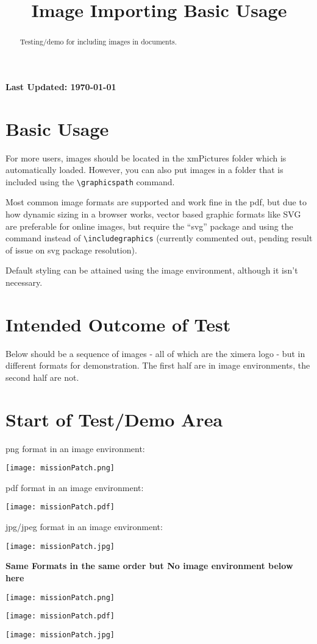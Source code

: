 \documentclass{ximera}
\title{Image Importing Basic Usage}
\begin{document}
\begin{abstract}
    Testing/demo for including images in documents.
\end{abstract}
\maketitle

{{\Huge \bfseries Last Updated: \today}} \\


\section{Basic Usage}
For more users, images should be located in the xmPictures folder which is automatically loaded.
However, you can also put images in a folder that is included using the \verb|\graphicspath| command.

Most common image formats are supported and work fine in the pdf, but due to how dynamic sizing in a browser works,
vector based graphic formats like SVG are preferable for online images, but require the ``svg'' package and using 
the command \verb|| instead of \verb|\includegraphics| (currently commented out, pending result of issue on svg package resolution).

Default styling can be attained using the image environment, although it isn't necessary.

\section{Intended Outcome of Test}
Below should be a sequence of images - all of which are the ximera logo - but in different formats for demonstration. 
The first half are in image environments, the second half are not.

\section{Start of Test/Demo Area}

%
%    
\begin{image}
    png format in an image environment:

    \texttt{[image: missionPatch.png]}
\end{image}
\begin{image}
    pdf format in an image environment:

    \texttt{[image: missionPatch.pdf]}
\end{image}
\begin{image}
    jpg/jpeg format in an image environment:

    \texttt{[image: missionPatch.jpg]}
\end{image}

\hrulefill

{{\bfseries \large Same Formats in the same order but No image environment below here}}

\hrulefill

%

\texttt{[image: missionPatch.png]}

\texttt{[image: missionPatch.pdf]}

\texttt{[image: missionPatch.jpg]}


\hrulefill
\end{document}
